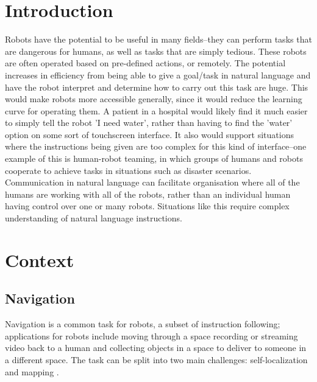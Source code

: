 \documentclass{article}
\begin{document}
\section{Introduction}
Robots have the potential to be useful in many fields–they can perform tasks
that are dangerous for humans, as well as tasks that are simply tedious. These
robots are often operated based on pre-defined actions, or remotely. The potential increases in efficiency from being able to give a goal/task in natural language and have the robot interpret and determine how to carry out this task are huge. %
This would make robots more accessible generally, since it would reduce the
learning curve for operating them. A patient in a hospital would likely find it much easier to simply tell the robot 'I need water', rather than having to find the 'water' option on some sort of touchscreen interface. It also would support situations where the instructions being given are too complex for this kind of interface--one example of this is human-robot teaming, in which groups of humans and robots cooperate to achieve tasks in situations such as disaster scenarios\cite{Kruijff-Korbayova:2015aa}. Communication in natural language can facilitate organisation where all of the humans are working with all of the robots, rather than an individual human having control over one or many robots. Situations like this require complex understanding of natural language instructions. 



\section{Context}
\subsection{Navigation}
Navigation is a common task for robots, a subset of instruction following; applications for robots include moving through a space recording or streaming video back to a human and collecting objects in a space to deliver to someone in a different space. The task can be split into two main challenges: self-localization and mapping \cite{Wallgrun:2007zr}. 
\end{document}
